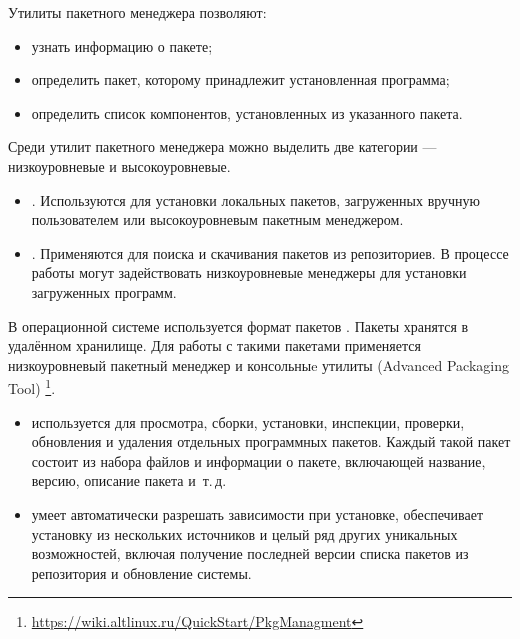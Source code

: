 Утилиты пакетного менеджера позволяют:

\begin{itemize}
	\item узнать информацию о пакете;
	\item определить пакет, которому принадлежит установленная программа;
	\item определить список компонентов, установленных из указанного пакета.
\end{itemize}

Среди утилит пакетного менеджера можно выделить две категории --- низкоуровневые и высокоуровневые.

\begin{itemize}
	\item {}. Используются для установки
	локальных пакетов, загруженных вручную пользователем или высокоуровневым пакетным менеджером.
	\item {}. Применяются для поиска и скачивания пакетов из репозиториев.
	В процессе работы могут задействовать низкоуровневые менеджеры для установки загруженных программ.
\end{itemize}

В операционной системе  используется формат пакетов .
Пакеты  хранятся в удалённом хранилище.
Для работы с такими пакетами применяется низкоуровневый пакетный менеджер 
и консольныe утилиты  (Advanced Packaging Tool)%
\footnote{\href{https://wiki.altlinux.ru/QuickStart/PkgManagment\#\%D0\%9E\%D1\%81\%D0\%BD\%D0\%BE\%D0\%B2\%D0\%BD\%D1\%8B\%D0\%B5_\%D0\%B8\%D0\%BD\%D1\%81\%D1\%82\%D1\%80\%D1\%83\%D0\%BC\%D0\%B5\%D0\%BD\%D1\%82\%D1\%8B_\%D0\%B4\%D0\%BB\%D1\%8F_\%D1\%83\%D0\%BF\%D1\%80\%D0\%B0\%D0\%B2\%D0\%BB\%D0\%B5\%D0\%BD\%D0\%B8\%D1\%8F_\%D0\%BF\%D0\%B0\%D0\%BA\%D0\%B5\%D1\%82\%D0\%B0\%D0\%BC\%D0\%B8}{https://wiki.altlinux.ru/QuickStart/PkgManagment}}.

\begin{itemize}
	\item {} используется для просмотра, сборки, установки, инспекции,
		проверки, обновления и удаления отдельных программных пакетов. Каждый такой пакет состоит
		из набора файлов и информации о пакете, включающей название, версию, описание пакета и~т.\,д.
	\item {} умеет автоматически
		разрешать зависимости при установке, обеспечивает установку из нескольких источников и целый
		ряд других уникальных возможностей, включая получение последней версии списка пакетов из
		репозитория и обновление системы.
\end{itemize}

